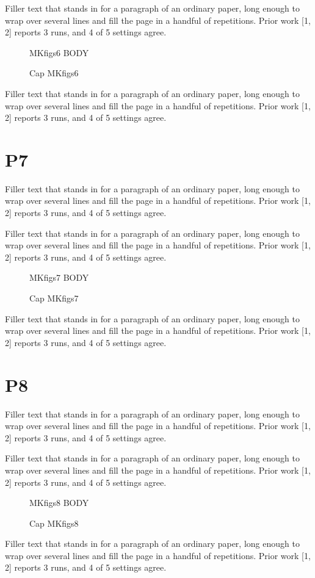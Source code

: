 \documentclass[titlepage]{article}
\begin{document}
Filler text that stands in for a paragraph of an ordinary paper, long enough to wrap over several lines and fill the page in a handful of repetitions. Prior work [1, 2] reports 3 runs, and 4 of 5 settings agree.\par
\begin{figure}[h]\centering MKfigs6 BODY\caption{Cap MKfigs6}\label{fig:s6}\end{figure}
Filler text that stands in for a paragraph of an ordinary paper, long enough to wrap over several lines and fill the page in a handful of repetitions. Prior work [1, 2] reports 3 runs, and 4 of 5 settings agree.\par
\newpage\section{P7}
Filler text that stands in for a paragraph of an ordinary paper, long enough to wrap over several lines and fill the page in a handful of repetitions. Prior work [1, 2] reports 3 runs, and 4 of 5 settings agree.\par
Filler text that stands in for a paragraph of an ordinary paper, long enough to wrap over several lines and fill the page in a handful of repetitions. Prior work [1, 2] reports 3 runs, and 4 of 5 settings agree.\par
\begin{figure}[h]\centering MKfigs7 BODY\caption{Cap MKfigs7}\label{fig:s7}\end{figure}
Filler text that stands in for a paragraph of an ordinary paper, long enough to wrap over several lines and fill the page in a handful of repetitions. Prior work [1, 2] reports 3 runs, and 4 of 5 settings agree.\par
\newpage\section{P8}
Filler text that stands in for a paragraph of an ordinary paper, long enough to wrap over several lines and fill the page in a handful of repetitions. Prior work [1, 2] reports 3 runs, and 4 of 5 settings agree.\par
Filler text that stands in for a paragraph of an ordinary paper, long enough to wrap over several lines and fill the page in a handful of repetitions. Prior work [1, 2] reports 3 runs, and 4 of 5 settings agree.\par
\begin{figure}[h]\centering MKfigs8 BODY\caption{Cap MKfigs8}\label{fig:s8}\end{figure}
Filler text that stands in for a paragraph of an ordinary paper, long enough to wrap over several lines and fill the page in a handful of repetitions. Prior work [1, 2] reports 3 runs, and 4 of 5 settings agree.\par
\end{document}

